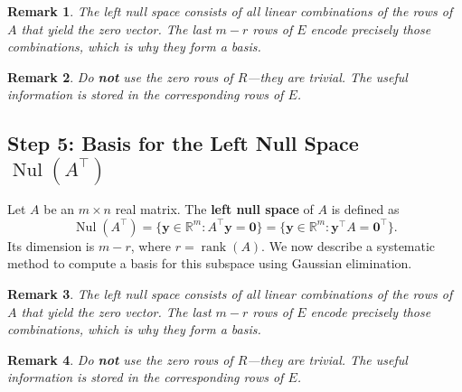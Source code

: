 \documentclass{article}
\newtheorem{remark}{Remark}
\begin{document}
\begin{remark}
The left null space consists of all linear combinations of the rows of $A$ that yield the zero vector. The last $m - r$ rows of $E$ encode precisely those combinations, which is why they form a basis.
\end{remark}

\begin{remark}
Do \textbf{not} use the zero rows of $R$—they are trivial. The useful information is stored in the corresponding rows of $E$.
\end{remark}


\subsection*{Step 5: Basis for the Left Null Space $\operatorname{Nul}(A^\top)$}


Let $A$ be an $m \times n$ real matrix. The \textbf{left null space} of $A$ is defined as
\[
\operatorname{Nul}(A^\top) = \{ \mathbf{y} \in \mathbb{R}^m : A^\top \mathbf{y} = \mathbf{0} \}
= \{ \mathbf{y} \in \mathbb{R}^m : \mathbf{y}^\top A = \mathbf{0}^\top \}.
\]
Its dimension is $m - r$, where $r = \operatorname{rank}(A)$. We now describe a systematic method to compute a basis for this subspace using Gaussian elimination.

\begin{remark}
The left null space consists of all linear combinations of the rows of $A$ that yield the zero vector. The last $m - r$ rows of $E$ encode precisely those combinations, which is why they form a basis.
\end{remark}

\begin{remark}
Do \textbf{not} use the zero rows of $R$—they are trivial. The useful information is stored in the corresponding rows of $E$.
\end{remark}
\end{document}
